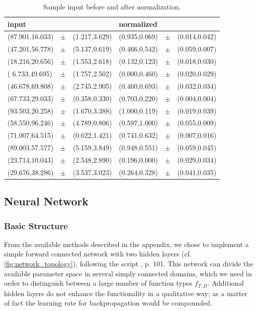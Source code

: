 \documentclass[useAMS,usenatbib]{mn2e}
\begin{document}
\begin{table}
\begin{center}
\begin{tabular}{lcllcl}\hline\hline
input&&&normalized&&\\
\hline
(87.901,16.033)&$\pm$&(1.217,3.629) & (0.935,0.069)&$\pm$&(0.014,0.042)\\
(47.201,56.778)&$\pm$&(5.137,0.619) & (0.466,0.542)&$\pm$&(0.059,0.007)\\
(18.216,20.656)&$\pm$&(1.553,2.618) & (0.132,0.123)&$\pm$&(0.018,0.030)\\
( 6.733,49.695)&$\pm$&(1.757,2.502) & (0.000,0.460)&$\pm$&(0.020,0.029)\\
(46.678,69.808)&$\pm$&(2.745,2.905) & (0.460,0.693)&$\pm$&(0.032,0.034)\\
(67.733,29.033)&$\pm$&(0.358,0.330) & (0.703,0.220)&$\pm$&(0.004,0.004)\\
(93.503,20.258)&$\pm$&(1.670,3.388) & (1.000,0.119)&$\pm$&(0.019,0.039)\\
(58.550,96.246)&$\pm$&(4.789,0.806) & (0.597,1.000)&$\pm$&(0.055,0.009)\\
(71.007,64.515)&$\pm$&(0.622,1.421) & (0.741,0.632)&$\pm$&(0.007,0.016)\\
(89.003,57.577)&$\pm$&(5.159,3.849) & (0.948,0.551)&$\pm$&(0.059,0.045)\\
(23.714,10.043)&$\pm$&(2.548,2.890) & (0.196,0.000)&$\pm$&(0.029,0.034)\\
(29.676,38.286)&$\pm$&(3.537,3.023) & (0.264,0.328)&$\pm$&(0.041,0.035)\\
\hline
\end{tabular}
\end{center}
\caption{\label{tab:ti1} Sample input before and after normalization.}
\end{table}

\subsection{Neural Network}
\subsubsection{Basic Structure}
From the available methods described in the appendix, we chose to
implement a simple forward connected network with two hidden layers
(cf. \ref{fig:network_topology}), following the script
\cite{Stoop2010}, p. 101. This network can divide the available
parameter space in several simply connected domains, which we need in
order to distinguish between a large number of function types
$f_{T,D}$. Additional hidden layers do not enhance the functionality
in a qualitative way; as a matter of fact the learning rate for
backpropagation would be compounded.
\end{document}
